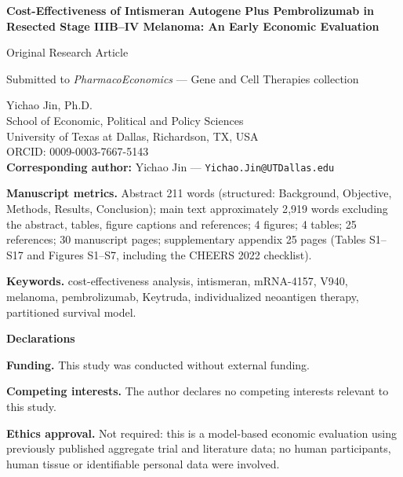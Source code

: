 \documentclass[11pt,a4paper]{article}
\begin{document}
\begin{center}
{\Large\bfseries Cost-Effectiveness of Intismeran Autogene Plus Pembrolizumab in Resected Stage IIIB--IV Melanoma: An Early Economic Evaluation\par}
\vspace{0.6em}
{\normalsize Original Research Article\par}
{\small Submitted to \textit{PharmacoEconomics} --- Gene and Cell Therapies collection\par}
\end{center}

\vspace{1.2em}
\begin{center}
{\large Yichao Jin, Ph.D.}\\[0.4em]
School of Economic, Political and Policy Sciences\\
University of Texas at Dallas, Richardson, TX, USA\\
ORCID: 0009-0003-7667-5143\\
\textbf{Corresponding author:} Yichao Jin --- \texttt{Yichao.Jin@UTDallas.edu}
\end{center}

\vspace{1.0em}
\textbf{Manuscript metrics.} Abstract 211 words (structured: Background, Objective, Methods, Results, Conclusion);
main text approximately 2{,}919 words excluding the abstract, tables, figure captions and references;
4 figures; 4 tables; 25 references; 30 manuscript pages; supplementary appendix 25 pages
(Tables S1--S17 and Figures S1--S7, including the CHEERS 2022 checklist).

\vspace{1.0em}
\textbf{Keywords.} cost-effectiveness analysis, intismeran, mRNA-4157, V940, melanoma, pembrolizumab,
Keytruda, individualized neoantigen therapy, partitioned survival model.

\vspace{1.2em}
\textbf{Declarations}

\textbf{Funding.} This study was conducted without external funding.

\textbf{Competing interests.} The author declares no competing interests relevant to this study.

\textbf{Ethics approval.} Not required: this is a model-based economic evaluation using previously published
aggregate trial and literature data; no human participants, human tissue or identifiable personal data were involved.
\end{document}
